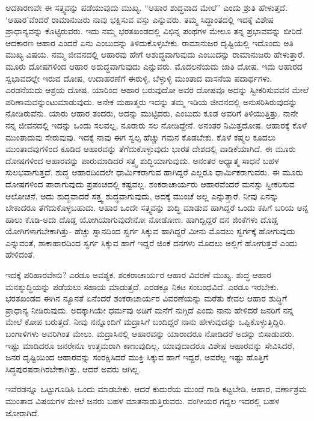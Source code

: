 ಆದಕಾರಣವೇ ಈ ಸತ್ತ್ವವನ್ನು ಪಡೆಯುವುದು ಮುಖ್ಯ. “ಆಹಾರ ಶುದ್ಧವಾದ ಮೇಲೆ” ಎಂದು ಶ್ರುತಿ ಹೇಳುತ್ತದೆ. ‘ಆಹಾರ’ವೆಂದರೆ ರಾಮಾನುಜರು ನಾವು ಭಕ್ಷಿಸುವ ವಸ್ತು ಎನ್ನುವರು. ತಮ್ಮ ಸಿದ್ಧಾಂತದಲ್ಲಿ ಇದಕ್ಕೆ ವಿಶೇಷ ಪ್ರಾಧಾನ್ಯವನ್ನು ಕೊಟ್ಟಿರುವರು. ಇದು ನಮ್ಮ ಭರತಖಂಡದಲ್ಲಿ ವಿಭಿನ್ನ ಪಂಥಗಳ ಮೇಲೂ ತನ್ನ ಪ್ರಭಾವವನ್ನು ಬೀರಿದೆ. ಆದಕಾರಣ ಆಹಾರ ಎಂದರೆ ಏನು ಎಂಬುದನ್ನು ತಿಳಿದುಕೊಳ್ಳಬೇಕು. ರಾಮಾನುಜರ ದೃಷ್ಟಿಯಲ್ಲಿ ಇದೊಂದು ಅತಿ ಮುಖ್ಯ ವಿಷಯ. ನಮ್ಮ ಜೀವನದಲ್ಲಿ ಆಹಾರವು ಹೇಗೆ ಅಶುದ್ಧವಾಗುವುದು ಎಂಬುದನ್ನು ರಾಮಾನುಜರು ಹೇಳುತ್ತಾರೆ. ಮೂರು ದೋಷಗಳಿಂದ ಆಹಾರ ಅಶುದ್ಧವಾಗುವುದು ಎನ್ನುವರು. ಮೊದಲನೆಯದು ಜಾತಿ ದೋಷ. ಇದು ಆಹಾರದ ಸ್ವಭಾವದಲ್ಲೇ ಇರುವ ದೋಷ, ಉದಾಹರಣೆಗೆ ಈರುಳ್ಳಿ, ಬೆಳ್ಳುಳ್ಳಿ ಮುಂತಾದ ವಾಸನೆಯ ಪದಾರ್ಥಗಳು. ಎರಡನೆಯದು ಆಶ್ರಯ ದೋಷ. ಯಾರಿಂದ ಆಹಾರ ಬರುವುದೋ ಅವರ ದೋಷವೂ ಅದನ್ನು ಸ್ವೀಕರಿಸುವವನ ಮೇಲೆ ಪರಿಣಾಮವನ್ನುಂಟುಮಾಡುವುದು. ಅನೇಕ ಮಹಾತ್ಮರು ಇದನ್ನು ತಮ್ಮ ಇಡಿಯ ಜೀವನದಲ್ಲಿ ಅನುಸರಿಸಿರುವುದನ್ನು ನೋಡಿರುವೆನು. ಯಾರು ಆಹಾರ ತಂದರು, ಅದನ್ನು ಮುಟ್ಟಿದರು, ಎಂಬುದು ಕೂಡ ಅವರಿಗೆ ತಿಳಿಯುತ್ತಿತ್ತು. ನಾನೇ ನನ್ನ ಜೀವನದಲ್ಲಿ ಇದನ್ನು ಒಂದು ಸಲವಲ್ಲ, ನೂರಾರು ಸಲ ನೋಡಿದ್ದೇನೆ. ಅನಂತರ ನಿಮಿತ್ತದೋಷ. ಆಹಾರಕ್ಕೆ ಕೊಳೆ ಮುಂತಾದುವು ಸೇರುವುವು. ಇದಕ್ಕೆ ನಾವು ಈಗ ಸ್ವಲ್ಪ ಹೆಚ್ಚು ಗಮನ ಕೊಡಬೇಕು. ಕೊಳೆ ಕಷ್ಮಲ ಕೂದಲು ಮುಂತಾದವುಗಳಿಂದ ಕೂಡಿದ ಆಹಾರವನ್ನು ತೆಗೆದುಕೊಳ್ಳುವುದು ಭಾರತ ದೇಶದಲ್ಲಿ ವಾಡಿಕೆಯಾಗಿದೆ. ಈ ಮೂರು ದೋಷಗಳಿಂದ ಆಹಾರವನ್ನು ಪಾರುಮಾಡಿದರೆ ಸತ್ತ್ವ ಶುದ್ಧಿಯಾಗುವುದು. ಅನಂತರ ಅಧ್ಯಾತ್ಮ ಸಾಧನೆ ಬಹಳ ಸುಲಭವಾಗುತ್ತದೆ. ಶುದ್ಧ ಆಹಾರದಿಂದಲೇ ಧಾರ್ಮಿಕರಾಗುವ ಹಾಗಿದ್ದರೆ ಎಲ್ಲರೂ ಧಾರ್ಮಿಕರಾಗುವರು. ಈ ಮೂರು ದೋಷಗಳಿಂದ ಪಾರಾಗುವುದು ಪ್ರಪಂಚದಲ್ಲಿ ಕಷ್ಟವಲ್ಲ. ಶಂಕರಾಚಾರ್ಯರು ಆಹಾರವೆಂದರೆ ಮನಸ್ಸು ಸ್ವೀಕರಿಸುವ ಆಲೋಚನೆ, ಅದು ಶುದ್ಧವಾದರೆ ಸತ್ತ್ವ ಶುದ್ಧವಾಗುವುದು, ಅದಕ್ಕೆ ಮುಂಚೆ ಅಲ್ಲ ಎನ್ನುತ್ತಾರೆ. ನೀವು ಏನನ್ನು ಬೇಕಾದರೂ ತೆಗೆದುಕೊಳ್ಳಬಹುದು. ಆಹಾರ ಒಂದೇ ಸತ್ತ್ವವನ್ನು ಶುದ್ಧಿ ಮಾಡುವ ಹಾಗಿದ್ದರೆ ಒಂದು ಕಪಿಗೆ ಬರಿಯ ಅನ್ನ ಹಾಲು ಕೊಡಿ-ಅದು ದೊಡ್ಡ ಯೋಗಿಯಾಗುವುದೇನೋ ನೋಡೋಣ. ಹಾಗಿದ್ದಿದ್ದರೆ ದನ ಜಿಂಕೆಗಳು ದೊಡ್ಡ ಯೋಗಿಗಳಾಗಬೇಕಾಗಿತ್ತು- ಹೆಚ್ಚು ಸ್ನಾನದಿಂದ ಸ್ವರ್ಗ ಸಿಕ್ಕುವ ಹಾಗಿದ್ದರೆ ಮೀನು ಮೊದಲು ಸ್ವರ್ಗಕ್ಕೆ ಹೋಗುವುದು ಎನ್ನುವಂತೆ, ಶಾಕಾಹಾರದಿಂದ ಸ್ವರ್ಗ ಸಿಕ್ಕುವ ಹಾಗೆ ಇದ್ದರೆ ಜಿಂಕೆ ದನಗಳು ಮೊದಲು ಅಲ್ಲಿಗೆ ಹೋಗುತ್ತವೆ ಎಂದು ಹೇಳಿದಂತೆ.

ಇದಕ್ಕೆ ಪರಿಹಾರವೇನು? ಎರಡೂ ಅವಶ್ಯಕ. ಶಂಕರಾಚಾರ್ಯರ ಆಹಾರ ವಿವರಣೆ ಮುಖ್ಯ. ಶುದ್ಧ ಆಹಾರ ಮನಶ್ಶುದ್ಧಿಯನ್ನು ಪಡೆಯಲು ಸಹಾಯ ಮಾಡುತ್ತದೆ. ಎರಡಕ್ಕೂ ನಿಕಟ ಸಂಬಂಧವಿದೆ. ಎರಡೂ ಇರಬೇಕು. ಭರತಖಂಡದ ಈಗಿನ ನ್ಯೂನತೆ ಏನೆಂದರೆ ಶಂಕರಾಚಾರ್ಯರ ವಿವರಣೆಯನ್ನು ಮರೆತು ಕೇವಲ ಆಹಾರ ಶುದ್ಧಿಗೆ ಪ್ರಾಧಾನ್ಯ ನೀಡಿರುವುದು. ಅದಕ್ಕಾಗಿಯೇ ಧರ್ಮವು ಅಡಿಗೆ ಮನೆಗೆ ನುಗ್ಗಿದೆ ಎಂದು ನಾನು ಹೇಳಿದರೆ ಜನರಿಗೆ ನನ್ನ ಮೇಲೆ ಕೋಪ ಬರುತ್ತದೆ. ನೀವು ನನ್ನೊಂದಿಗೆ ಮದ್ರಾಸಿಗೆ ಬಂದಿದ್ದರೆ ನಾನು ಹೇಳುವುದನ್ನು ಒಪ್ಪಿಕೊಳ್ಳುತ್ತಿದ್ದಿರಿ. ಬಂಗಾಳಿಗಳು ಅವರಿಗಿಂತ ಮೇಲು. ಮದ್ರಾಸಿನಲ್ಲಿ ಆಹಾರವನ್ನು ಯಾರಾದರೂ ನೋಡಿದರೆ ಅದನ್ನು ಬಿಸಾಡುವರು. ಇಷ್ಟು ಮಾಡಿದರೂ ಜನರೇನೂ ಉತ್ತಮರಾಗಿ ಕಾಣುವುದಿಲ್ಲ. ಯಾವುದಾದರೂ ವಿಶೇಷ ಆಹಾರವನ್ನು ಸೇವಿಸಿದರೆ, ಜನರ ದೃಷ್ಟಿಯಿಂದ ಆಹಾರವನ್ನು ಸಂರಕ್ಷಿಸಿದರೆ ಮುಕ್ತಿ ಸಿಕ್ಕುವ ಹಾಗೆ ಇದ್ದರೆ, ಅವರೆಲ್ಲ ಇಷ್ಟು ಹೊತ್ತಿಗೆ ಸಿದ್ಧಪುರಷರಾಗಿರಬೇಕಾಗಿತ್ತು. ಆದರೆ ಅವರು ಆಗಿಲ್ಲ.

ಇವೆರಡನ್ನೂ ಒಟ್ಟುಗೂಡಿಸಿ ಒಂದು ಮಾಡಬೇಕು. ಆದರೆ ಕುದುರೆಯ ಮುಂದೆ ಗಾಡಿ ಕಟ್ಟಬೇಡಿ. ಆಹಾರ, ವರ್ಣಾಶ್ರಮ ಮುಂತಾದ ವಿಷಯಗಳ ಮೇಲೆ ಜನರು ಬಹಳ ಮಾತನಾಡುತ್ತಿರುವರು. ವಂಗೀಯರ ಗದ್ದಲ ಇದರಲ್ಲಿ ಬಹಳ ಜೋರಾಗಿದೆ.

